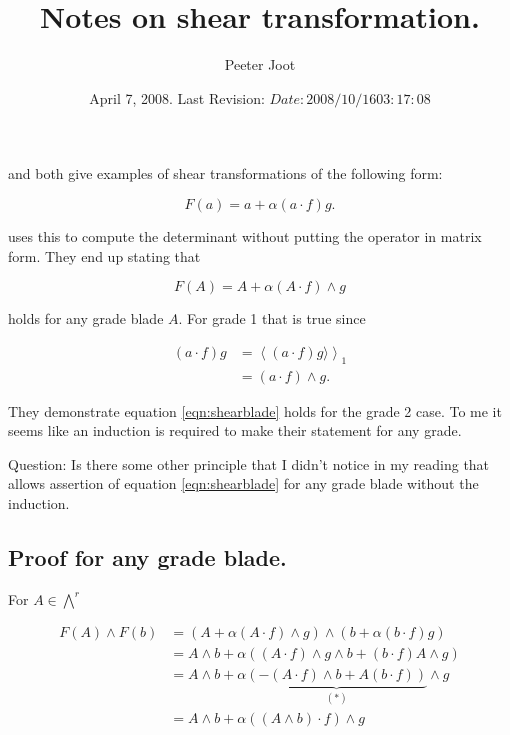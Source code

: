 \documentclass{article}
\title{ Notes on shear transformation. }
\author{Peeter Joot}
\date{ April 7, 2008.  Last Revision: $Date: 2008/10/16 03:17:08 $ }
\newcommand{\gpgrade}[2] {{\left\langle{{#1}}\right\rangle}_{#2}}
\begin{document}
\maketitle{}

\section{}

\cite{dorst2007gac} and \cite{doran2003gap}
both give examples of shear transformations of the following
form:

\[
F(a) = a + \alpha(a \cdot f) g.
\]

\cite{doran2003gap}
uses this to compute the determinant without putting the operator in matrix form.  They end up stating that 

\begin{equation}\label{eqn:shearblade}
F(A) = A + \alpha (A \cdot f) \wedge g
\end{equation}

holds for any grade blade $A$.  For grade 1 that is true since

\begin{align*}
(a \cdot f) g 
&= \gpgrade{(a \cdot f) g \rangle}{1} \\
&= (a \cdot f) \wedge g.
\end{align*}

They demonstrate equation \ref{eqn:shearblade}
holds for the grade 2 case.  To me it seems
like an induction is required to make their statement for any grade.

Question: Is there some other principle that I didn't notice in my reading that allows assertion of 
equation \ref{eqn:shearblade}
for any grade blade without the induction.

\subsection{ Proof for any grade blade. }

For $A \in {\bigwedge}^r$

\begin{align*}
F(A) \wedge F(b)
&= \left(A + \alpha (A \cdot f) \wedge g \right) \wedge
   \left(b + \alpha(b \cdot f) g \right) \\
&= A \wedge b
 + \alpha 
\left(
(A \cdot f) \wedge g \wedge b
+ (b \cdot f) A \wedge g 
\right) \\
&= A \wedge b
 + \alpha 
\underbrace{
\left(
-(A \cdot f) \wedge b
+ A (b \cdot f) 
\right)
}_{(*)} 
\wedge g
\\
&= A \wedge b + \alpha ((A \wedge b) \cdot f) \wedge g
\end{align*}
\end{document}
